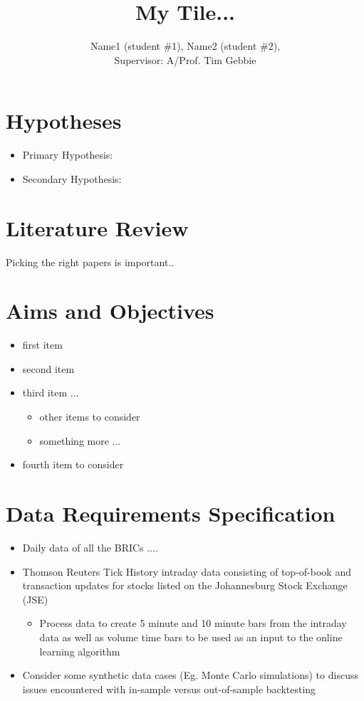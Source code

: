 \documentclass[a4paper,latin]{paper}
\title{My Tile...}
\author{Name1 (student \#1), Name2 (student \#2), \\ Supervisor: A/Prof. Tim Gebbie}
\begin{document}
 


\section{Hypotheses} 
\begin{itemize}
\item Primary Hypothesis: 
\item Secondary Hypothesis: 
\end{itemize}

\section{Literature Review} 
Picking the right papers is important..



\section{Aims and Objectives}  
\begin{itemize}
\item[1] first item
\item[2] second item
\item[3] third item ...
\begin{itemize}
\item other items to consider
\item something more ...
\end{itemize}
\item[4]  fourth item to consider
\end{itemize}
\section{Data Requirements Specification}
\begin{itemize}
\item Daily data of all the BRICs ....
\item Thomson Reuters Tick History intraday data consisting of top-of-book and transaction updates for stocks listed on the Johannesburg Stock Exchange (JSE)
\begin{itemize}
\item Process data to create 5 minute and 10 minute bars from the intraday data as well as volume time bars to be used as an input to the online learning algorithm
\end{itemize}
\item Consider some synthetic data cases (Eg. Monte Carlo simulations) to discuss issues encountered with in-sample versus out-of-sample backtesting
\end{itemize}
\end{document}

